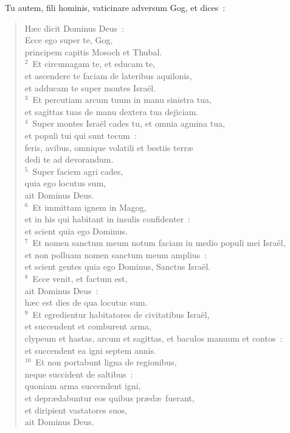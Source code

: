 ~Tu autem, fili hominis, vaticinare adversum Gog, et dices~: \begin{flushleft}\begin{verse}\vspace{6pt}H\ae c dicit Dominus Deus~:\\ Ecce ego super te, Gog,\\ principem capitis Mosoch et Thubal.\\
${}^{2}$~Et circumagam te, et educam te,\\ et ascendere te faciam de lateribus aquilonis,\\ et adducam te super montes Isra\"el.\\
${}^{3}$~Et percutiam arcum tuum in manu sinistra tua,\\ et sagittas tuas de manu dextera tua dejiciam.\\
${}^{4}$~Super montes Isra\"el cades tu, et omnia agmina tua,\\ et populi tui qui sunt tecum~:\\ feris, avibus, omnique volatili et bestiis terr\ae \\ dedi te ad devorandum.\\
${}^{5}$~Super faciem agri cades,\\ quia ego locutus sum,\\ ait Dominus Deus.\\
${}^{6}$~Et immittam ignem in Magog,\\ et in his qui habitant in insulis confidenter~:\\ et scient quia ego Dominus.\\
${}^{7}$~Et nomen sanctum meum notum faciam in medio populi mei Isra\"el,\\ et non polluam nomen sanctum meum amplius~:\\ et scient gentes quia ego Dominus, Sanctus Isra\"el.\\
${}^{8}$~Ecce venit, et factum est,\\ ait Dominus Deus~:\\ h\ae c est dies de qua locutus sum.\\
${}^{9}$~Et egredientur habitatores de civitatibus Isra\"el,\\ et succendent et comburent arma,\\ clypeum et hastas, arcum et sagittas, et baculos manuum et contos~:\\ et succendent ea igni septem annis.\\
${}^{10}$~Et non portabunt ligna de regionibus,\\ neque succident de saltibus~:\\ quoniam arma succendent igni,\\ et depr\ae dabuntur eos quibus pr\ae d\ae\ fuerant,\\ et diripient vastatores suos,\\ ait Dominus Deus.\end{verse}\end{flushleft}


